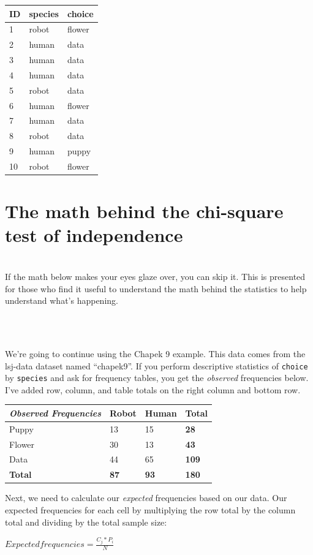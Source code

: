 \documentclass[
]{book}
\newenvironment{info}
    {
    \hline\\
    }
    { 
    \\\\\hline
    }
\begin{document}
\begin{longtable}[]{@{}lll@{}}
\toprule
ID & species & choice\tabularnewline
\midrule
\endhead
1 & robot & flower\tabularnewline
2 & human & data\tabularnewline
3 & human & data\tabularnewline
4 & human & data\tabularnewline
5 & robot & data\tabularnewline
6 & human & flower\tabularnewline
7 & human & data\tabularnewline
8 & robot & data\tabularnewline
9 & human & puppy\tabularnewline
10 & robot & flower\tabularnewline
\bottomrule
\end{longtable}

\hypertarget{the-math-behind-the-chi-square-test-of-independence}{%
\section{The math behind the chi-square test of independence}\label{the-math-behind-the-chi-square-test-of-independence}}

\begin{info}
If the math below makes your eyes glaze over, you can skip it. This is
presented for those who find it useful to understand the math behind the
statistics to help understand what's happening.
\end{info}

We're going to continue using the Chapek 9 example. This data comes from the lsj-data dataset named ``chapek9''. If you perform descriptive statistics of \texttt{choice} by \texttt{species} and ask for frequency tables, you get the \emph{observed} frequencies below. I've added row, column, and table totals on the right column and bottom row.

\begin{longtable}[]{@{}llll@{}}
\toprule
\emph{Observed Frequencies} & Robot & Human & Total\tabularnewline
\midrule
\endhead
Puppy & 13 & 15 & \textbf{28}\tabularnewline
Flower & 30 & 13 & \textbf{43}\tabularnewline
Data & 44 & 65 & \textbf{109}\tabularnewline
\textbf{Total} & \textbf{87} & \textbf{93} & \textbf{180}\tabularnewline
\bottomrule
\end{longtable}

Next, we need to calculate our \emph{expected} frequencies based on our data. Our expected frequencies for each cell by multiplying the row total by the column total and dividing by the total sample size:

\(Expected frequencies = \frac{C_j * P_i}{N}\)
\end{document}
